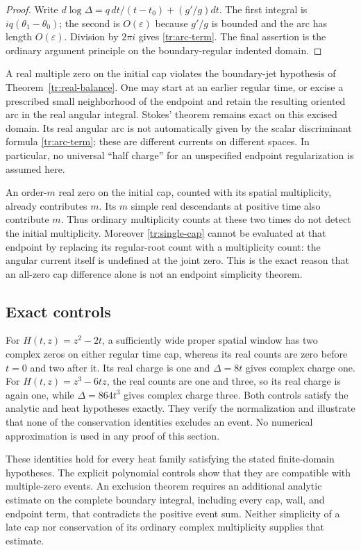 \begin{proof}
Write $d\log\Delta=q\,dt/(t-t_0)+(g'/g)dt$.  The first integral is
$iq(\theta_1-\theta_0)$; the second is $O(\varepsilon)$ because
$g'/g$ is bounded and the arc has length $O(\varepsilon)$.  Division
by $2\pi i$ gives \eqref{tr:arc-term}.  The final assertion is the
ordinary argument principle on the boundary-regular indented domain.
\end{proof}

\begin{remark}\label{tr:endpoint-warning}
A real multiple zero on the initial cap violates the boundary-jet
hypothesis of Theorem~\ref{tr:real-balance}.  One may start at an earlier
regular time, or excise a prescribed small neighborhood of the endpoint
and retain the resulting oriented arc in the real angular integral.
Stokes' theorem remains exact on this excised domain.  Its real angular
arc is not automatically given by the scalar discriminant formula
\eqref{tr:arc-term}; these are different currents on different spaces.
In particular, no universal ``half charge'' for an unspecified endpoint
regularization is assumed here.

An order-$m$ real zero on the initial cap, counted with its spatial
multiplicity, already contributes $m$.  Its $m$ simple real descendants
at positive time also contribute $m$.  Thus ordinary multiplicity
counts at these two times do not detect the initial multiplicity.
Moreover \eqref{tr:single-cap} cannot be evaluated at that endpoint by
replacing its regular-root count with a multiplicity count: the angular
current itself is undefined at the joint zero.  This is the exact
reason that an all-zero cap difference alone is not an endpoint
simplicity theorem.
\end{remark}

\subsection{Exact controls}

For $H(t,z)=z^2-2t$, a sufficiently wide proper spatial window has two
complex zeros on either regular time cap, whereas its real counts are
zero before $t=0$ and two after it.  Its real charge is one and
$\Delta=8t$ gives complex charge one.  For
$H(t,z)=z^3-6tz$, the real counts are one and three, so its real charge
is again one, while $\Delta=864t^3$ gives complex charge three.
Both controls satisfy the analytic and heat hypotheses exactly.
They verify the normalization and illustrate that none of the
conservation identities excludes an event.  No numerical approximation
is used in any proof of this section.

\begin{remark}[Scope]\label{tr:scope}
These identities hold for every heat family satisfying the stated
finite-domain hypotheses.  The explicit polynomial controls show that
they are compatible with multiple-zero events.  An exclusion theorem
requires an additional analytic estimate on the complete boundary
integral, including every cap, wall, and endpoint term, that contradicts
the positive event sum.  Neither simplicity of a late cap nor
conservation of its ordinary complex multiplicity supplies that estimate.
\end{remark}
